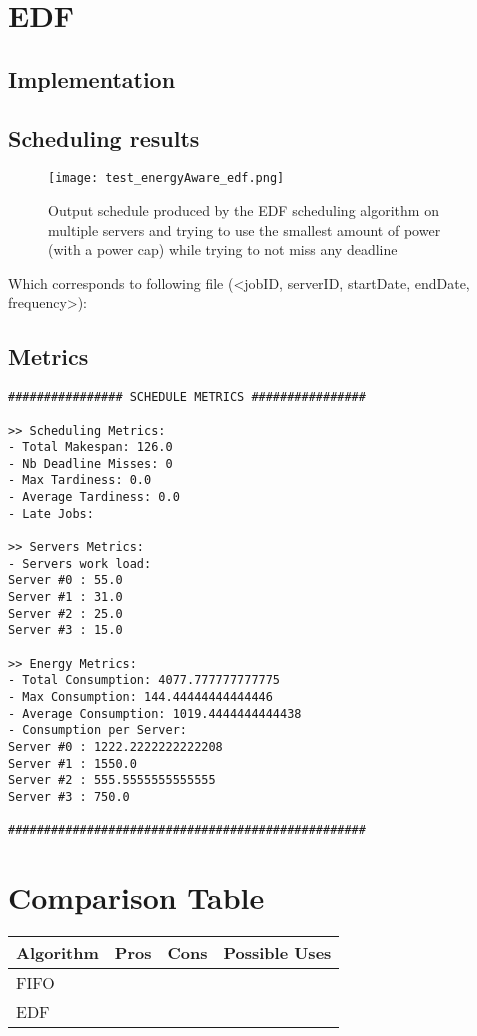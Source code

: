 \documentclass[./report.tex]{subfiles}
\begin{document}
\newpage
\section{EDF}
\subsection{Implementation}

\subsection{Scheduling results}
\begin{figure}[!h]
	\center
	\texttt{[image: test\_energyAware\_edf.png]}
	\caption{Output schedule produced by the EDF scheduling algorithm on multiple servers and trying to use the smallest amount of power (with a power cap) while trying to not miss any deadline}
	\label{fig:energyAware_fifo} 
\end{figure}

Which corresponds to following file (<jobID, serverID, startDate, endDate, frequency>):


\newpage
\subsection{Metrics}
\begin{lstlisting}[style=txt, caption={Metrics for EDF on multiple energy aware servers}]
################ SCHEDULE METRICS ################

>> Scheduling Metrics: 
- Total Makespan: 126.0
- Nb Deadline Misses: 0
- Max Tardiness: 0.0
- Average Tardiness: 0.0
- Late Jobs: 

>> Servers Metrics: 
- Servers work load:
Server #0 : 55.0
Server #1 : 31.0
Server #2 : 25.0
Server #3 : 15.0

>> Energy Metrics: 
- Total Consumption: 4077.777777777775
- Max Consumption: 144.44444444444446
- Average Consumption: 1019.4444444444438
- Consumption per Server: 
Server #0 : 1222.2222222222208
Server #1 : 1550.0
Server #2 : 555.5555555555555
Server #3 : 750.0

##################################################
\end{lstlisting}


\newpage
\section{Comparison Table}

\begin{tabular}{|m{8em}|m{12em}|m{12em}|m{12em}|} 
	\hline 
	\textbf{Algorithm} & \textbf{Pros} & \textbf{Cons} & \textbf{Possible Uses} \\ 
	\hline
	FIFO &  &  & \\
	\hline
	EDF &  &  & \\
	\hline
\end{tabular}
\end{document}
